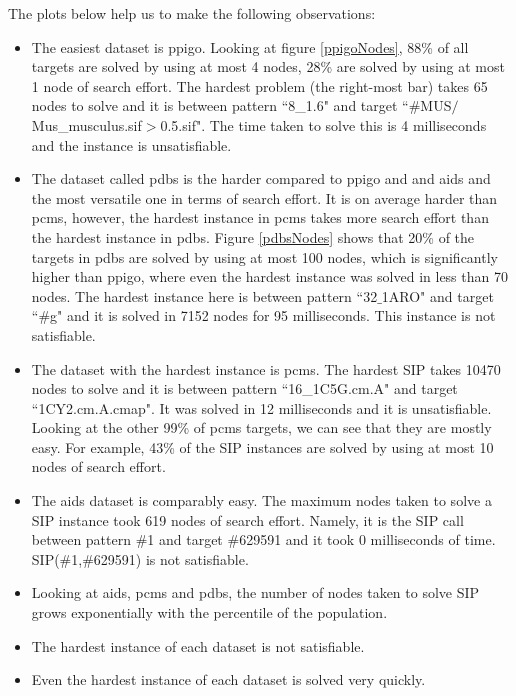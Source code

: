 \documentclass{l4proj}
\newcounter{example}[section]
\begin{document}
The plots below help us to make the following observations:
\begin{itemize}
\item The easiest dataset is ppigo. Looking at figure \ref{ppigoNodes}, 88\% of all targets are solved by using at most 4 nodes, 28\% are solved by using at most 1 node of search effort. The hardest problem (the right-most bar) takes 65 nodes to solve and it is between pattern ``8\_1.6" and target ``\#MUS$/$Mus\_musculus.sif$>$0.5.sif". The time taken to solve this is 4 milliseconds and the instance is unsatisfiable.

\item The dataset called pdbs is the harder compared to ppigo and and aids and the most versatile one in terms of search effort. It is on average harder than pcms, however, the hardest instance in pcms takes more search effort than the hardest instance in pdbs. Figure \ref{pdbsNodes} shows that 20\% of the targets in pdbs are solved by using at most 100 nodes, which is significantly higher than ppigo, where even the hardest instance was solved in less than 70 nodes. The hardest instance here is between pattern ``32$\_$1ARO" and target ``\#g" and it is solved in 7152 nodes for 95 milliseconds. This instance is not satisfiable. 

\item The dataset with the hardest instance is pcms. The hardest SIP takes 10470 nodes to solve and it is between pattern ``16\_1C5G.cm.A" and target ``1CY2.cm.A.cmap". It was solved in 12 milliseconds and it is unsatisfiable. Looking at the other 99\% of pcms targets, we can see that they are mostly easy. For example, 43\% of the SIP instances are solved by using at most 10 nodes of search effort.

\item The aids dataset is comparably easy. The maximum nodes taken to solve a SIP instance took 619 nodes of search effort. Namely, it is the SIP call between pattern \#1 and target \#629591 and it took 0 milliseconds of time. SIP(\#1,\#629591) is not satisfiable.

\item Looking at aids, pcms and pdbs, the number of nodes taken to solve SIP grows exponentially with the percentile of the population.

\item The hardest instance of each dataset is not satisfiable.

\item Even the hardest instance of each dataset is solved very quickly.
\end{itemize}
\end{document}
